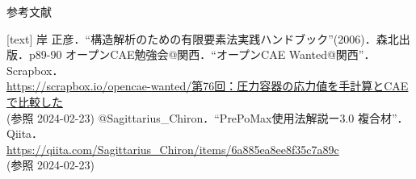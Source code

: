 \begin{frame}{参考文献}
  \begin{thebibliography}{9}
     [text]
      岸 正彦．“構造解析のための有限要素法実践ハンドブック”(2006)．森北出版．p89-90
      オープンCAE勉強会@関西．“オープンCAE Wanted@関西”．Scrapbox． \\
         {\scriptsize \fontsize{10pt}{10pt}  \color{cud_orange}
          \url{https://scrapbox.io/opencae-wanted/第76回：圧力容器の応力値を手計算とCAEで比較した}} \\
          (参照 2024-02-23)
      @Sagittarius\_Chiron．“PrePoMax使用法解説ー3.0 複合材”．Qiita．\\
           {\footnotesize {} \color{cud_orange}
           \url{https://qiita.com/Sagittarius_Chiron/items/6a885ea8ee8f35c7a89c}} \\
           (参照 2024-02-23)
  \end{thebibliography}
\end{frame}
